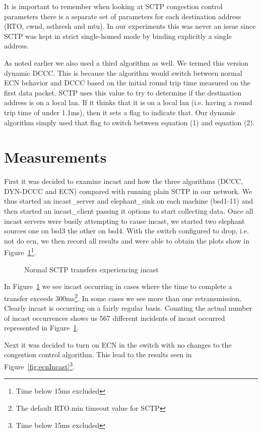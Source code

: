 \documentclass[12pt]{article}
\begin{document}
It is important to remember when looking at SCTP congestion control parameters there
is a separate set of parameters for each destination address (RTO, cwnd, ssthresh and mtu). In
our experiments this was never an issue since SCTP was kept in strict single-homed mode
by binding explicitly a single address. 

As noted earlier we also used a third algorithm as well. We termed this version dynamic DCCC. This
is because the algorithm would switch between normal ECN behavior and DCCC based on the
initial round trip time measured on the first data packet. SCTP uses this value to try to determine
if the destination address is on a local lan. If it thinks that it is on a local lan (i.e. having a round
trip time of under 1.1ms), then it sets a flag to indicate that. Our dynamic algorithm simply used
that flag to switch between equation (1) and equation (2).

\section{Measurements}
\label{measure}
First it was decided to examine incast and how the three algorithms (DCCC, DYN-DCCC and ECN) compared with
running plain SCTP in our network. We thus started an incast\_server and elephant\_sink on each machine (bsd1-11) and then 
started an incast\_client passing it options to start collecting data. Once all incast servers were busily attempting to cause
incast, we started two elephant sources one on bsd3 the other on bsd4. With the switch configured to drop, i.e. not do ecn, we
then record all results and were able to obtain the plots show in Figure~\ref{fig:noEcnIncast}\footnote{Time below 15ms excluded}.
\begin{figure}[h]
\centering
{}
\caption{Normal SCTP transfers experiencing incast}
\label{fig:noEcnIncast}
\end{figure}

In Figure~\ref{fig:noEcnIncast} we see incast occurring in cases where the time to complete a transfer exceeds
300ms\footnote{The default RTO.min timeout value for SCTP}. In some cases we see more than
one retransmission. Clearly incast is occurring on a fairly regular basis. Counting the actual number
of incast occurrences shows us 567 different incidents of incast occurred represented in Figure~\ref{fig:noEcnIncast}.

\newpage

Next it was decided to turn on ECN in the switch with no changes to the congestion control algorithm. This
lead to the results seen in Figure~\ref{fig:ecnIncast}\footnote{Time below 15ms excluded}.
\end{document}
